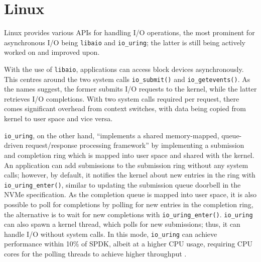 \section{Linux}
Linux provides various APIs for handling I/O operations, the most prominent for asynchronous I/O being \texttt{libaio} and \texttt{io\_uring}; the latter is still being actively worked on and improved upon.

With the use of \texttt{libaio}, applications can access block devices asynchronously. This centres around the two system calls \texttt{io\_submit()} and \texttt{io\_getevents()}. As the names suggest, the former submits I/O requests to the kernel, while the latter retrieves I/O completions. With two system calls required per request, there comes significant overhead from context switches, with data being copied from kernel to user space and vice versa.

\texttt{io\_uring}, on the other hand, ``implements a shared memory-mapped, queue-driven request/response processing framework'' \cite{storage_api} by implementing a submission and completion ring which is mapped into user space and shared with the kernel. An application can add submissions to the submission ring without any system calls; however, by default, it notifies the kernel about new entries in the ring with \texttt{io\_uring\_enter()}, similar to updating the submission queue doorbell in the NVMe specification. As the completion queue is mapped into user space, it is also possible to poll for completions by polling for new entries in the completion ring, the alternative is to wait for new completions with \texttt{io\_uring\_enter()}. \texttt{io\_uring} can also spawn a kernel thread, which polls for new submissions; thus, it can handle I/O without system calls. In this mode, \texttt{io\_uring} can achieve performance within 10\% of SPDK, albeit at a higher CPU usage, requiring CPU cores for the polling threads to achieve higher throughput \cite{storage_api}.
